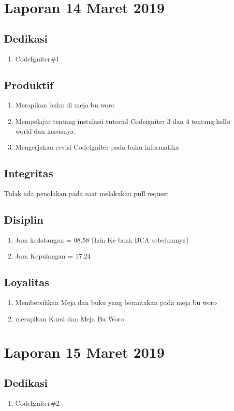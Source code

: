 \section{Laporan 14  Maret 2019}
\subsection{Dedikasi}
\begin{enumerate}
\item CodeIgniter\#1
\end{enumerate}
\subsection{Produktif}
\begin{enumerate}
\item Merapikan buku di meja bu woro
\item Mempelajar tentang instalasii tutorial Codeigniter 3 dan 4 tentang hello world dan kasusnya.
\item Mengerjakan revisi CodeIgniter pada buku informatika
\end{enumerate}
\subsection{Integritas}
Tidak ada penolakan pada saat melakukan pull request
\subsection{Disiplin}
\begin{enumerate}
\item Jam kedatangan =  08.58 (Izin Ke bank BCA sebelumnya)
\item Jam Kepulangan = 17.24
\end{enumerate}
\subsection{Loyalitas}
\begin{enumerate}
\item Membersihkan Meja dan buku yang berantakan pada meja bu woro
\item merapikan Kursi dan Meja Bu Woro
\end{enumerate}

\section{Laporan 15 Maret 2019}
\subsection{Dedikasi}
\begin{enumerate}
\item CodeIgniter\#2
\end{enumerate}
